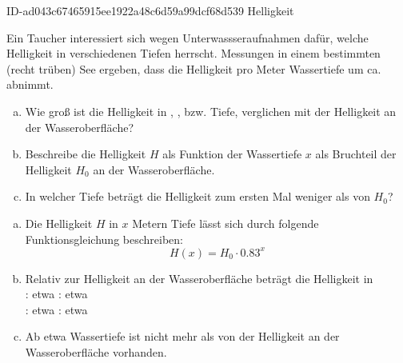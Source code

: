 \begin{exercise}
      {ID-ad043c67465915ee1922a48c6d59a99dcf68d539}
      {Helligkeit}
  \ifproblem\problem\par
    Ein Taucher interessiert sich wegen Unterwassseraufnahmen
    dafür, welche Helligkeit in verschiedenen Tiefen herrscht.
    Messungen in einem bestimmten (recht trüben) See ergeben,
    dass die Helligkeit pro Meter Wassertiefe um ca. 
    abnimmt.
    \begin{enumerate}[a)]
      \item Wie groß ist die Helligkeit in , ,
             bzw.  Tiefe, verglichen mit der
            Helligkeit an der Wasseroberfläche?
      \item Beschreibe die Helligkeit $H$ als Funktion der
            Wassertiefe $x$ als Bruchteil der Helligkeit
            $H_{0}$ an der Wasseroberfläche.
      \item In welcher Tiefe beträgt die Helligkeit zum ersten Mal
            weniger als  von $H_{0}$?
    \end{enumerate}
  \fi
  \ifoutcome\outcome\par
    \begin{enumerate}[a)]
      \item Die Helligkeit $H$ in $x$ Metern Tiefe lässt sich
            durch folgende Funktionsgleichung beschreiben:
            \begin{equation*}
              H(x)=H_{0}\cdot\num{0.83}^{x}
            \end{equation*}
      \item Relativ zur Helligkeit an der Wasseroberfläche beträgt
            die Helligkeit in\\
            : etwa
            : etwa
            \\
            : etwa
            : etwa
      \item Ab etwa  Wassertiefe ist nicht mehr als 
            von der Helligkeit an der Wasseroberfläche vorhanden.
    \end{enumerate}
  \fi
\end{exercise}
